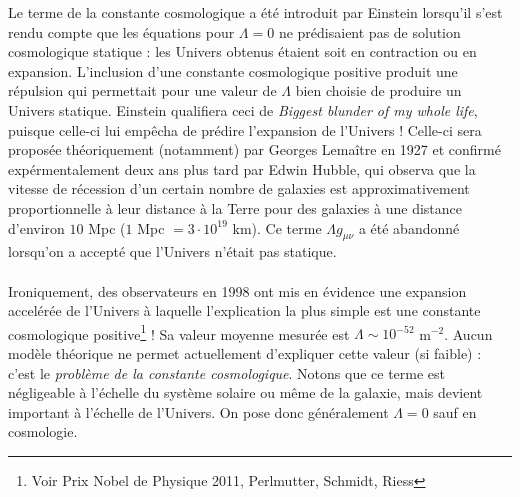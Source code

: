 Le terme de la constante cosmologique a été introduit par Einstein lorsqu'il s'est rendu compte que les équations pour $\Lambda = 0$ ne prédisaient pas de solution cosmologique statique : les Univers obtenus étaient soit en contraction ou en expansion. L'inclusion d'une constante cosmologique positive produit une répulsion qui permettait pour une valeur de $\Lambda$ bien choisie de produire un Univers statique. Einstein qualifiera ceci de \emph{Biggest blunder of my whole life}, puisque celle-ci lui empêcha de prédire l'expansion de l'Univers ! Celle-ci sera proposée théoriquement (notamment) par Georges Lemaître en 1927 et confirmé expérmentalement deux ans plus tard par Edwin Hubble, qui observa que la vitesse de récession d'un certain nombre de galaxies est approximativement proportionnelle à leur distance à la Terre pour des galaxies à une distance d'environ $10$ Mpc ($1$ Mpc $ = 3 \cdot 10^{19}$ km). Ce terme $\Lambda g_{\mu\nu}$ a été abandonné lorsqu'on a accepté que l'Univers n'était pas statique.\\
\\
Ironiquement, des observateurs en 1998 ont mis en évidence une expansion accelérée de l'Univers à laquelle l'explication la plus simple est une constante cosmologique positive\footnote{Voir Prix Nobel de Physique 2011, Perlmutter, Schmidt, Riess} ! Sa valeur moyenne mesurée est $\Lambda \sim 10^{-52}$ m$^{-2}$. Aucun modèle théorique ne permet actuellement d'expliquer cette valeur (si faible) : c'est le \emph{problème de la constante cosmologique}. Notons que ce terme est négligeable à l'échelle du système solaire ou même de la galaxie, mais devient important à l'échelle de l'Univers. On pose donc généralement $\Lambda = 0$ sauf en cosmologie.

